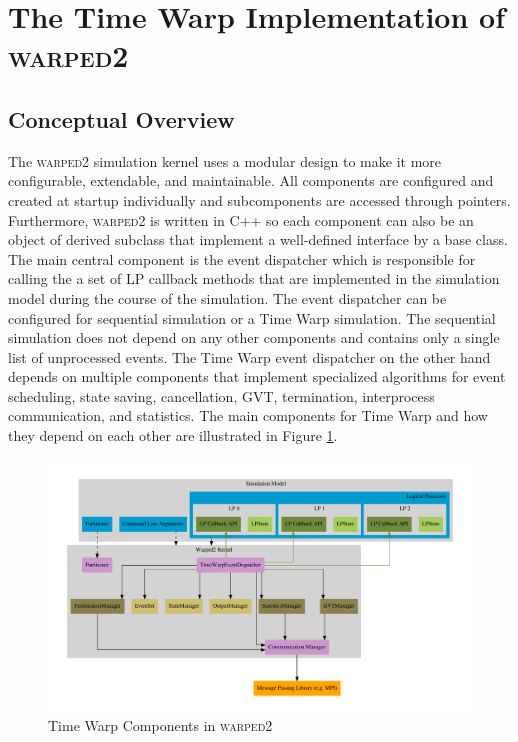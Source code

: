 \documentclass[11pt]{book}
\begin{document}
\section{The Time Warp Implementation of \textsc{warped2}}


\subsection{Conceptual Overview}

The \textsc{warped2} simulation kernel uses a modular design to make it more configurable,
extendable, and maintainable.  All components are configured and created at startup individually
and subcomponents are accessed through pointers.  Furthermore, \textsc{warped2} is written in
C++ so each component can also be an object of derived subclass that implement a well-defined
interface by a base class.  The main central component is the event dispatcher which is responsible
for calling the a set of LP callback methods that are implemented in the simulation model during
the course of the simulation.  The event dispatcher can be configured for sequential simulation
or a Time Warp simulation.  The sequential simulation does not depend on any other components and
contains only a single list of unprocessed events.  The Time Warp event dispatcher on the other
hand depends on multiple components that implement specialized algorithms for event scheduling,
state saving, cancellation, GVT, termination, interprocess communication, and statistics.  The
main components for Time Warp and how they depend on each other are illustrated in Figure
\ref{warped2_architecture}.

\begin{figure}
    \centering
    \includegraphics[width=\textwidth,quiet]{figs/graphviz/warped2_overview.pdf}
    \caption{Time Warp Components in \textsc{warped2}}\label{warped2_architecture}
\end{figure}
\end{document}
